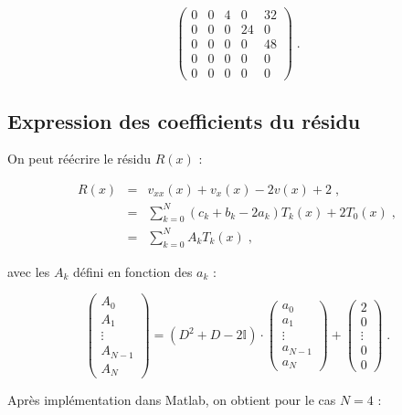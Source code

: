 \documentclass{report}
\begin{document}
\begin{equation}
\begin{pmatrix}
0 & 0 & 4 & 0 & 32\\ 
0 & 0 & 0 & 24 & 0\\ 
0 & 0 & 0 & 0 & 48\\ 
0 & 0 & 0 & 0 & 0\\ 
0 & 0 & 0 & 0 & 0
\end{pmatrix} \;.
\end{equation}

\subsection*{Expression des coefficients du résidu}

On peut réécrire le résidu $R(x)$ :

\begin{eqnarray}
R(x) & = & v_{xx}(x) + v_x(x) - 2v(x) + 2\;,  \\
& = & \sum_{k=0}^N \left(c_{k}+b_{k}-2a_{k}\right)T_{k}(x)+2 T_{0}(x)\;, \\
& = & \sum_{k=0}^N A_{k} T_{k}(x)\;, 
\end{eqnarray}

avec les $A_{k}$ défini en fonction des $a_{k}$ :

\begin{equation}
\begin{pmatrix}
 A_{0}\\ 
 A_{1}\\ 
 \vdots\\ 
 A_{N-1}\\ 
 A_{N}
\end{pmatrix} 
= \left(D^{2} + D - 2 \mathbb{I}\right) \cdot \begin{pmatrix}
 a_0\\ 
 a_1\\ 
 \vdots\\ 
 a_{N-1}\\ 
 a_{N}
\end{pmatrix}
+ \begin{pmatrix}
 2\\ 
 0\\ 
 \vdots\\ 
 0\\ 
 0
\end{pmatrix}\;.\label{Ak}
\end{equation}

Après implémentation dans Matlab, on obtient pour le cas $N=4$ :
\end{document}
